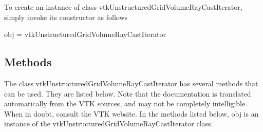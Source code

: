 To create an instance of class vtk\-Unstructured\-Grid\-Volume\-Ray\-Cast\-Iterator, simply invoke its constructor as follows \begin{DoxyVerb}  obj = vtkUnstructuredGridVolumeRayCastIterator
\end{DoxyVerb}
 \hypertarget{vtkwidgets_vtkxyplotwidget_Methods}{}\subsection{Methods}\label{vtkwidgets_vtkxyplotwidget_Methods}
The class vtk\-Unstructured\-Grid\-Volume\-Ray\-Cast\-Iterator has several methods that can be used. They are listed below. Note that the documentation is translated automatically from the V\-T\-K sources, and may not be completely intelligible. When in doubt, consult the V\-T\-K website. In the methods listed below, {\ttfamily obj} is an instance of the vtk\-Unstructured\-Grid\-Volume\-Ray\-Cast\-Iterator class. 
